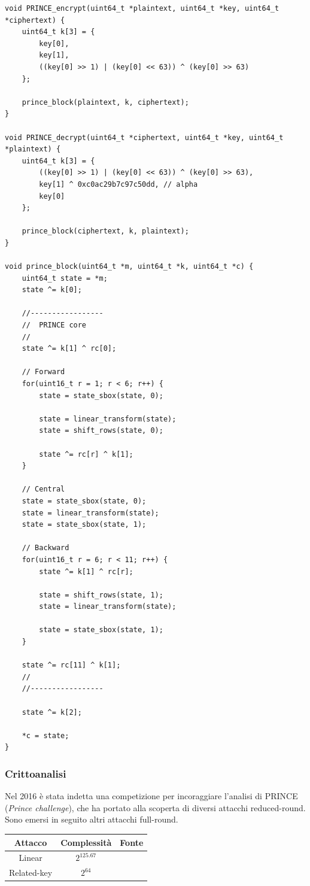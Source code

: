 \documentclass[target=bach,aauheader=,style=]{thud}
\begin{document}
						\begin{algorithm}
				\caption{Codice C PRINCE}
\begin{lstlisting}[style=CStyle]
void PRINCE_encrypt(uint64_t *plaintext, uint64_t *key, uint64_t *ciphertext) {
	uint64_t k[3] = {
		key[0],
		key[1],
		((key[0] >> 1) | (key[0] << 63)) ^ (key[0] >> 63)
	};
	
	prince_block(plaintext, k, ciphertext);
}

void PRINCE_decrypt(uint64_t *ciphertext, uint64_t *key, uint64_t *plaintext) {
	uint64_t k[3] = {
		((key[0] >> 1) | (key[0] << 63)) ^ (key[0] >> 63),
		key[1] ^ 0xc0ac29b7c97c50dd, // alpha
		key[0]
	};
	
	prince_block(ciphertext, k, plaintext);
}

void prince_block(uint64_t *m, uint64_t *k, uint64_t *c) {
	uint64_t state = *m;
	state ^= k[0];
	
	//-----------------
	//	PRINCE core
	//
	state ^= k[1] ^ rc[0];
	
	// Forward
	for(uint16_t r = 1; r < 6; r++) {
		state = state_sbox(state, 0);
		
		state = linear_transform(state);
		state = shift_rows(state, 0);
		
		state ^= rc[r] ^ k[1];
	}
	
	// Central
	state = state_sbox(state, 0);
	state = linear_transform(state);
	state = state_sbox(state, 1);
	
	// Backward
	for(uint16_t r = 6; r < 11; r++) {
		state ^= k[1] ^ rc[r];
		
		state = shift_rows(state, 1);
		state = linear_transform(state);
		
		state = state_sbox(state, 1);
	}
	
	state ^= rc[11] ^ k[1];
	//
	//-----------------
	
	state ^= k[2];
	
	*c = state;
}\end{lstlisting}
			\end{algorithm}
			\subsubsection{Crittoanalisi}
			Nel 2016 è stata indetta una competizione per incoraggiare l'analisi di PRINCE (\textit{Prince challenge}), che ha portato alla scoperta di diversi attacchi reduced-round. Sono emersi in seguito altri attacchi full-round.
			\begin{center}
				\begin{tabular}{ |c|c|c| } 
					\hline
					Attacco & Complessità & Fonte \\ 
					\hline 
					\hline
					Linear & $2^{125.67}$ & \cite{princesec}\\
					\hline
					Related-key & $2^{64}$ & \cite{princesec}\\
					\hline
				\end{tabular}
			\end{center}
\end{document}
